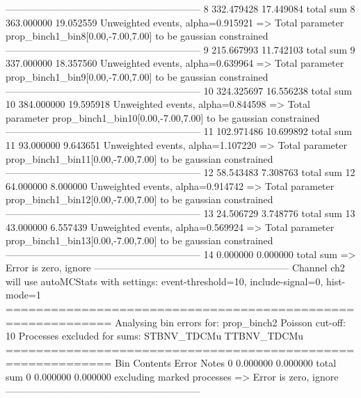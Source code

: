 ------------------------------------------------------------
8          332.479428      17.449084       total sum                     
8          363.000000      19.052559       Unweighted events, alpha=0.915921
  => Total parameter prop_binch1_bin8[0.00,-7.00,7.00] to be gaussian constrained
------------------------------------------------------------
9          215.667993      11.742103       total sum                     
9          337.000000      18.357560       Unweighted events, alpha=0.639964
  => Total parameter prop_binch1_bin9[0.00,-7.00,7.00] to be gaussian constrained
------------------------------------------------------------
10         324.325697      16.556238       total sum                     
10         384.000000      19.595918       Unweighted events, alpha=0.844598
  => Total parameter prop_binch1_bin10[0.00,-7.00,7.00] to be gaussian constrained
------------------------------------------------------------
11         102.971486      10.699892       total sum                     
11         93.000000       9.643651        Unweighted events, alpha=1.107220
  => Total parameter prop_binch1_bin11[0.00,-7.00,7.00] to be gaussian constrained
------------------------------------------------------------
12         58.543483       7.308763        total sum                     
12         64.000000       8.000000        Unweighted events, alpha=0.914742
  => Total parameter prop_binch1_bin12[0.00,-7.00,7.00] to be gaussian constrained
------------------------------------------------------------
13         24.506729       3.748776        total sum                     
13         43.000000       6.557439        Unweighted events, alpha=0.569924
  => Total parameter prop_binch1_bin13[0.00,-7.00,7.00] to be gaussian constrained
------------------------------------------------------------
14         0.000000        0.000000        total sum                     
  => Error is zero, ignore      
------------------------------------------------------------
Channel ch2 will use autoMCStats with settings: event-threshold=10, include-signal=0, hist-mode=1
============================================================
Analysing bin errors for: prop_binch2
Poisson cut-off: 10
Processes excluded for sums: STBNV_TDCMu TTBNV_TDCMu
============================================================
Bin        Contents        Error           Notes                         
0          0.000000        0.000000        total sum                     
0          0.000000        0.000000        excluding marked processes    
  => Error is zero, ignore      
------------------------------------------------------------
